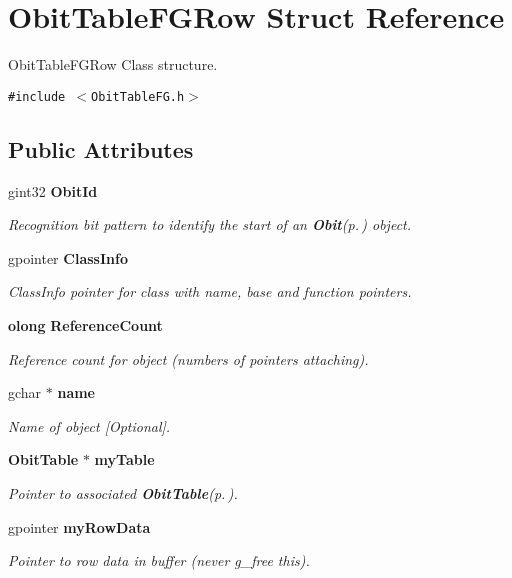 \section{Obit\-Table\-FGRow Struct Reference}
\label{structObitTableFGRow}
Obit\-Table\-FGRow Class structure.  


{\tt \#include $<$Obit\-Table\-FG.h$>$}

\subsection*{Public Attributes}
\begin{CompactItemize}
\item 
gint32 {\bf Obit\-Id}
\begin{CompactList}\small\item\em Recognition bit pattern to identify the start of an {\bf Obit}{\rm (p.\,\pageref{structObit})} object. \item\end{CompactList}\item 
gpointer {\bf Class\-Info}
\begin{CompactList}\small\item\em Class\-Info pointer for class with name, base and function pointers. \item\end{CompactList}\item 
{\bf olong} {\bf Reference\-Count}
\begin{CompactList}\small\item\em Reference count for object (numbers of pointers attaching). \item\end{CompactList}\item 
gchar $\ast$ {\bf name}
\begin{CompactList}\small\item\em Name of object [Optional]. \item\end{CompactList}\item 
{\bf Obit\-Table} $\ast$ {\bf my\-Table}
\begin{CompactList}\small\item\em Pointer to associated {\bf Obit\-Table}{\rm (p.\,\pageref{structObitTable})}. \item\end{CompactList}\item 
gpointer {\bf my\-Row\-Data}
\begin{CompactList}\small\item\em Pointer to row data in buffer (never g\_\-free this). \item\end{CompactList}\item 

\end{CompactItemize}
